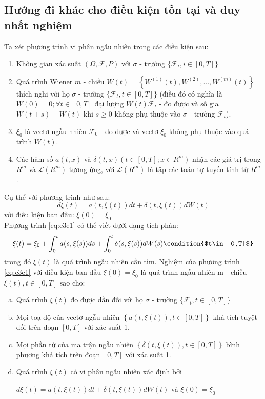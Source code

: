 \documentclass[a4paper]{article}
\numberwithin{equation}{section}
\begin{document}
\subsection{Hướng đi khác cho điều kiện tồn tại và duy nhất nghiệm}
Ta xét phương trình vi phân ngẫu nhiên trong các điều kiện sau:
\begin{enumerate}[(1)]
	\item Không gian xác suất $(\Omega,\mathscr{F},P)$ với $\sigma$ - trường $\{\mathscr{F}_t,i\in [0,T]\}$
	\item Quá trình Wiener $m$ - chiều $W(t)=\left\{W^{(1)}(t),W^{(2)},...,W^{(m)}(t) \right\}$ thích nghi với họ $\sigma$ - trường $\{\mathscr{F}_t,t\in [0,T] \}$ (điều đó có nghĩa là $W(0)=0;\forall t\in[0,T]$ đại lượng $W(t)\mathscr{F}_t$ - đo được và số gia $W(t+s)-W(t)$ khi $s\geq0$ không phụ thuộc vào $\sigma$ - trường $\mathscr{F}_t$).
	\item $\xi_0$ là vectơ ngẫu nhiên $\mathscr{F}_0$ - đo được và vectơ $\xi_0$ không phụ thuộc vào quá trình $W(t)$.
	\item Các hàm số $a(t,x)$ và $\delta(t,x)\left(t\in [0,T];x\in R^m \right)$ nhận các giá trị trong $R^m$ và $\mathscr{L}(R^m)$ tương ứng, với $\mathscr{L}(R^m)$ là tập các toán tự tuyến tính từ $R^m$.\\
\end{enumerate}
Cụ thể với phương trình như sau:
\begin{equation}\label{eq:c3e1}
	d\xi(t)=a(t,\xi(t))dt+\delta(t,\xi(t))dW(t)
\end{equation}
với điều kiện ban đầu: $\xi(0)=\xi_0$\\
Phương trình \eqref{eq:c3e1} có thể viết dưới dạng tích phân:
\begin{equation*}
	\xi(t)=\xi_0+\int_{0}^{t}a(s,\xi(s))ds+\int_{0}^{t}\delta(s,\xi(s))dW(s) \condition{$t\in[0,T]$}
\end{equation*}
trong đó $\xi(t)$ là quá trình ngẫu nhiên cần tìm. Nghiệm của phương trình \eqref{eq:c3e1} với điều kiện ban đầu $\xi(0)=\xi_0$ là quá trình ngẫu nhiên m - chiều $\xi(t),t\in[0,T]$ sao cho:\\
\begin{enumerate}[a)]
	\item Quá trình $\xi(t)$ đo được dần đối với họ $\sigma$ - trường $\{\mathscr{F}_t,t\in[0,T]\}$
	\item Mọi toạ độ của vectơ ngẫu nhiên $\left\{a(t,\xi(t)),t\in[0,T] \right\}$ khả tích tuyệt đối trên đoạn $[0,T]$ với xác suất 1.
	\item Mọi phần tử của ma trận ngẫu nhiên $\left\{\delta(t,\xi(t)),t\in[0,T] \right\}$ bình phương khả tích trên đoạn $[0,T]$ với xác suất 1.
	\item Quá trình $\xi(t)$ có vi phân ngẫu nhiên xác định bởi 
\begin{center}
	$d\xi(t)=a(t,\xi(t))dt+\delta(t,\xi(t))dW(t)$ và $\xi(0)=\xi_0$
\end{center}
\end{enumerate}
\end{document}
